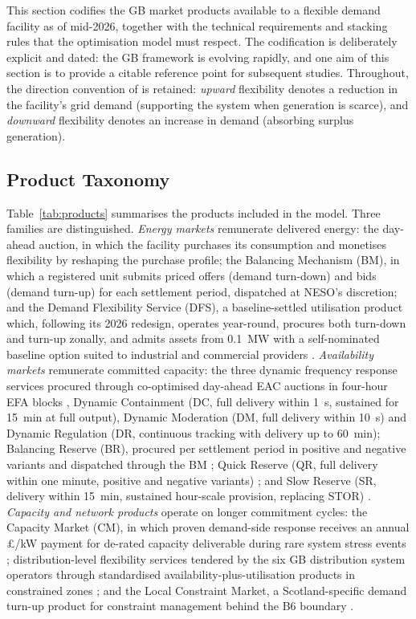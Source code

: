 \documentclass[lettersize,journal]{IEEEtran}
\begin{document}
This section codifies the GB market products available to a flexible demand facility as of mid-2026, together with the technical requirements and stacking rules that the optimisation model must respect. The codification is deliberately explicit and dated: the GB framework is evolving rapidly, and one aim of this section is to provide a citable reference point for subsequent studies. Throughout, the direction convention of \cite{takci2026characterisation} is retained: \emph{upward} flexibility denotes a reduction in the facility's grid demand (supporting the system when generation is scarce), and \emph{downward} flexibility denotes an increase in demand (absorbing surplus generation).

\subsection{Product Taxonomy}

Table~\ref{tab:products} summarises the products included in the model. Three families are distinguished. \emph{Energy markets} remunerate delivered energy: the day-ahead auction, in which the facility purchases its consumption and monetises flexibility by reshaping the purchase profile; the Balancing Mechanism (BM), in which a registered unit submits priced offers (demand turn-down) and bids (demand turn-up) for each settlement period, dispatched at NESO's discretion; and the Demand Flexibility Service (DFS), a baseline-settled utilisation product which, following its 2026 redesign, operates year-round, procures both turn-down and turn-up zonally, and admits assets from 0.1~MW with a self-nominated baseline option suited to industrial and commercial providers \cite{neso2026dfs,neso2026dfsshakeup}. \emph{Availability markets} remunerate committed capacity: the three dynamic frequency response services procured through co-optimised day-ahead EAC auctions in four-hour EFA blocks \cite{neso2026eac,neso2026dynamic}, Dynamic Containment (DC, full delivery within 1~s, sustained for 15~min at full output), Dynamic Moderation (DM, full delivery within 10~s) and Dynamic Regulation (DR, continuous tracking with delivery up to 60~min); Balancing Reserve (BR), procured per settlement period in positive and negative variants and dispatched through the BM \cite{neso2026br}; Quick Reserve (QR, full delivery within one minute, positive and negative variants) \cite{neso2026qr,ofgem2024qr}; and Slow Reserve (SR, delivery within 15~min, sustained hour-scale provision, replacing STOR) \cite{neso2025srdesign}. \emph{Capacity and network products} operate on longer commitment cycles: the Capacity Market (CM), in which proven demand-side response receives an annual \pounds/kW payment for de-rated capacity deliverable during rare system stress events \cite{desnz2026cmparams,drax2026cm}; distribution-level flexibility services tendered by the six GB distribution system operators through standardised availability-plus-utilisation products in constrained zones \cite{ena2026flex,enwl2025dfp}; and the Local Constraint Market, a Scotland-specific demand turn-up product for constraint management behind the B6 boundary \cite{neso2026lcm,neso2025lcmext}.
\end{document}
